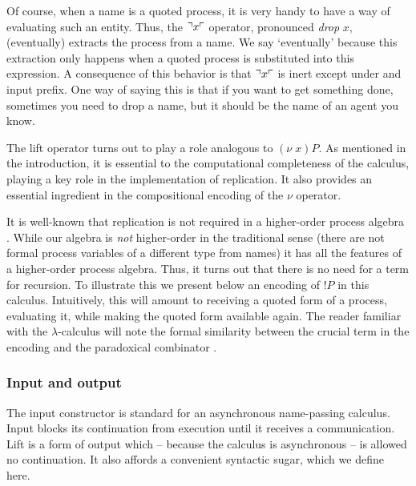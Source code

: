 Of course, when a name is a quoted process, it is very handy to have a
way of evaluating such an entity. Thus, the $\urcorner x \ulcorner$ operator,
pronounced \textit{drop} $x$, (eventually) extracts the process from a
name. We say `eventually' because this extraction only happens when a
quoted process is substituted into this expression. A consequence of
this behavior is that $\urcorner x \ulcorner$ is inert except under and input
prefix. One way of saying this is that if you want to get something
done, sometimes you need to drop a name, but it should be the name of
an agent you know.

\begin{remark} %
  The lift operator turns out to play a role analogous to $(\nu \;
  x)P$. As mentioned in the introduction, it is essential to the
  computational completeness of the calculus, playing a key role in
  the implementation of replication. It also provides an essential
  ingredient in the compositional encoding of the $\nu$ operator.
\end{remark}

\begin{remark} %
  It is well-known that replication is not required in a higher-order
  process algebra \cite{SangiorgiWalker}. While our algebra is
  \textit{not} higher-order in the traditional sense (there are not
  formal process variables of a different type from names) it has all
  the features of a higher-order process algebra. Thus, it turns out
  that there is no need for a term for recursion. To illustrate this
  we present below an encoding of $!P$ in this calculus. Intuitively,
  this will amount to receiving a quoted form of a process, evaluating
  it, while making the quoted form available again. The reader
  familiar with the $\lambda$-calculus will note the formal similarity
  between the crucial term in the encoding and the paradoxical
  combinator \cite{Barendregt84}.
\end{remark}

\subsubsection{Input and output}

The input constructor is standard for an asynchronous name-passing
calculus. Input blocks its continuation from execution until it
receives a communication. Lift is a form of output which -- because
the calculus is asynchronous -- is allowed no continuation. It also
affords a convenient syntactic sugar, which we define here.

